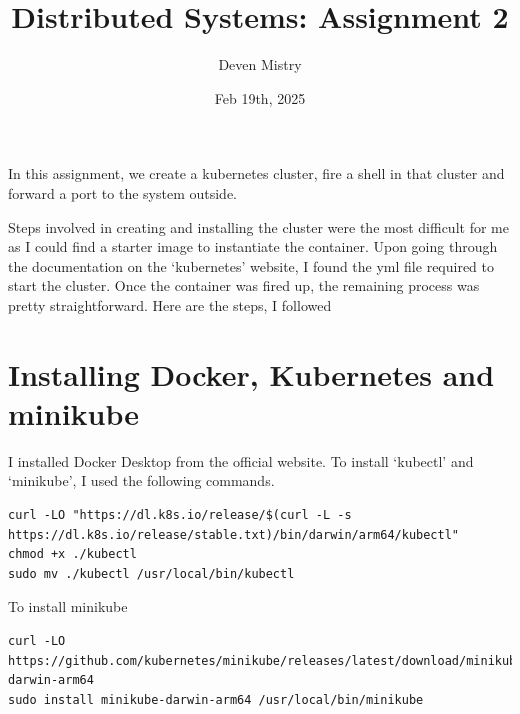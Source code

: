 \documentclass{article}
\title{Distributed Systems: Assignment 2}
\author{Deven Mistry}
\date{Feb 19th, 2025}
\begin{document}
\maketitle

In this assignment, we create a kubernetes cluster, fire a shell in that cluster and forward a port to the system outside.

Steps involved in creating and installing the cluster were the most difficult for me as I could find a starter image to instantiate the container. Upon going through the documentation on the `kubernetes' website, I found the yml file required to start the cluster. Once the container was fired up, the remaining process was pretty straightforward. Here are the steps, I followed



\section*{Installing Docker, Kubernetes and minikube}

I installed Docker Desktop from the official website. To install `kubectl' and `minikube', I used the following commands.

\begin{lstlisting}
curl -LO "https://dl.k8s.io/release/$(curl -L -s https://dl.k8s.io/release/stable.txt)/bin/darwin/arm64/kubectl"
chmod +x ./kubectl
sudo mv ./kubectl /usr/local/bin/kubectl
\end{lstlisting}

To install minikube

\begin{lstlisting}
curl -LO https://github.com/kubernetes/minikube/releases/latest/download/minikube-darwin-arm64
sudo install minikube-darwin-arm64 /usr/local/bin/minikube
\end{lstlisting}


\end{document}
